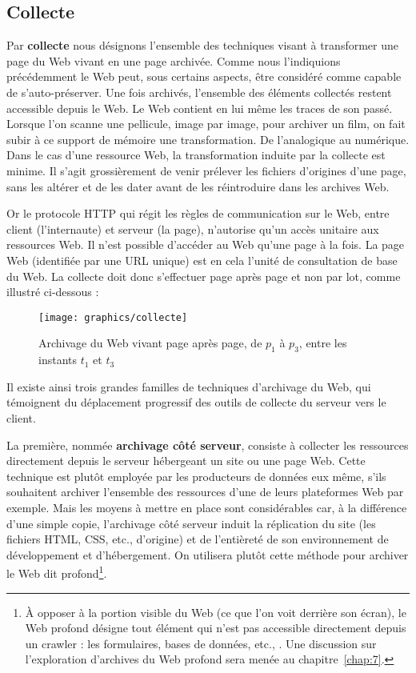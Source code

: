 \documentclass[symmetric,justified,marginals=raggedouter]{tufte-book}
\begin{document}
\subsection{Collecte}

\noindent Par \textbf{collecte} nous désignons l'ensemble des techniques visant à transformer une page du Web vivant en une page archivée. Comme nous l'indiquions précédemment le Web peut, sous certains aspects, être considéré comme capable de s'auto-préserver. Une fois archivés, l'ensemble des éléments collectés restent accessible depuis le Web. Le Web contient en lui même les traces de son passé. Lorsque l'on scanne une pellicule, image par image, pour archiver un film, on fait subir à ce support de mémoire une transformation. De l'analogique au numérique. Dans le cas d'une ressource Web, la transformation induite par la collecte est minime. Il s'agit grossièrement de venir prélever les fichiers d'origines d'une page, sans les altérer et de les dater avant de les réintroduire dans les archives Web.     

Or le protocole HTTP qui régit les règles de communication sur le Web, entre client (l'internaute) et serveur (la page), n'autorise qu'un accès unitaire aux ressources Web. Il n'est possible d'accéder au Web qu'une page à la fois. La page Web (identifiée par une URL unique) est en cela l'unité de consultation de base du Web. La collecte doit donc s'effectuer page après page et non par lot, comme illustré ci-dessous :   

\begin{figure*}%
  \texttt{[image: graphics/collecte]}
  \caption{Archivage du Web vivant page après page, de $p_1$ à $p_3$, entre les instants $t_1$ et $t_3$}
  \label{fig:collecte}
\end{figure*} 

\noindent Il existe ainsi trois grandes familles de techniques d'archivage du Web, qui témoignent du déplacement progressif des outils de collecte du serveur vers le client. 

La première, nommée \textbf{archivage côté serveur}, consiste à collecter les ressources directement depuis le serveur hébergeant un site ou une page Web. Cette technique est plutôt employée par les producteurs de données eux même, s'ils souhaitent archiver l'ensemble des ressources d'une de leurs plateformes Web par exemple. Mais les moyens à mettre en place sont considérables car, à la différence d'une simple copie, l'archivage côté serveur induit la réplication du site (les fichiers HTML, CSS, etc., d'origine) et de l'entièreté de son environnement de dévelop\-pement et d'hébergement. On utilisera plutôt cette méthode pour archiver le Web dit profond\footnote{\RaggedOuter À opposer à la portion visible du Web (ce que l'on voit derrière son écran), le Web profond désigne tout élément qui n'est pas accessible directement depuis un crawler : les formulaires, bases de données, etc., \citep{lawrence_accessibility_2000}. Une discussion sur l'exploration d'archives du Web profond sera menée au chapitre~\ref{chap:7}.}.
\end{document}
